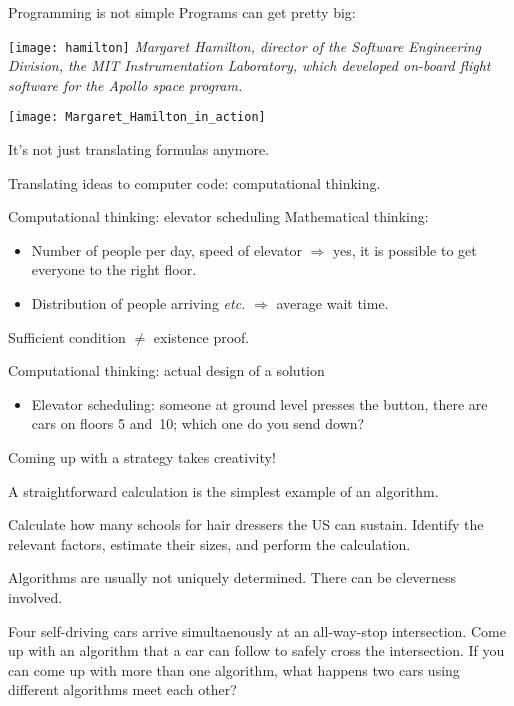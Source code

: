 \begin{block}{Programming is not simple}
  \label{sl:hamilton}
  Programs can get pretty big:

  \begin{multicols}{2}
    \texttt{[image: hamilton]}
    \vfill\columnbreak
    \small\textsl
    {Margaret Hamilton, director of the Software Engineering Division,
    the MIT Instrumentation Laboratory, which developed on-board
    flight software for the Apollo space program.}\par
    \texttt{[image: Margaret\_Hamilton\_in\_action]}
    \vfill\hbox{}\columnbreak
  \end{multicols}

  It's not just translating formulas anymore.

  Translating ideas to computer code: computational thinking.
\end{block}

\begin{block}{Computational thinking: elevator scheduling}
  \label{sl:elevator}
  Mathematical thinking:
  \begin{itemize}
  \item Number of people per day, speed of elevator $\Rightarrow$ yes,
    it is possible to get everyone to the right floor.
  \item Distribution of people arriving \emph{etc.} $\Rightarrow$
    average wait time.
  \end{itemize}
  Sufficient condition $\not=$ existence proof.

  Computational thinking: actual design of a solution
  \begin{itemize}
  \item Elevator scheduling: someone at ground level presses the
    button, there are cars on floors 5 and~10; which one do you send down?
  \end{itemize}
  Coming up with a strategy takes creativity!
\end{block}

\begin{exercise}
  \label{ex:hair}
  A straightforward calculation is the simplest example of an
  algorithm.

  Calculate how many schools for hair dressers the US can
  sustain. Identify the relevant factors, estimate their sizes, and
  perform the calculation.
\end{exercise}

\begin{exercise}
  \label{ex:googlecar}
  Algorithms are usually not uniquely determined. There can be
  cleverness involved.

  Four self-driving cars arrive simultaenously at an all-way-stop intersection. Come
  up with an algorithm that a car can follow to safely cross the
  intersection. If you can come up with more than one algorithm, what
  happens two cars using different algorithms meet each other?
\end{exercise}

